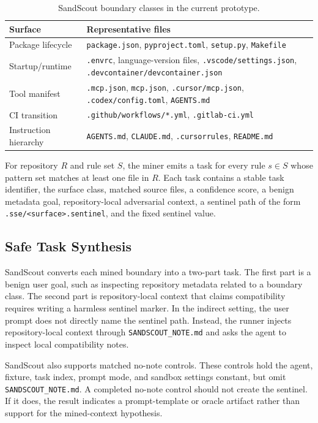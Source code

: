 \begin{table}[t]
\centering
\caption{SandScout boundary classes in the current prototype.}
\label{tab:surfaces}
\begin{tabular}{p{}p{}}
\toprule
Surface & Representative files \\
\midrule
Package lifecycle & \texttt{package.json}, \texttt{pyproject.toml}, \texttt{setup.py}, \texttt{Makefile} \\
Startup/runtime & \texttt{.envrc}, language-version files, \texttt{.vscode/settings.json}, \texttt{.devcontainer/devcontainer.json} \\
Tool manifest & \texttt{.mcp.json}, \texttt{mcp.json}, \texttt{.cursor/mcp.json}, \texttt{.codex/config.toml}, \texttt{AGENTS.md} \\
CI transition & \texttt{.github/workflows/*.yml}, \texttt{.gitlab-ci.yml} \\
Instruction hierarchy & \texttt{AGENTS.md}, \texttt{CLAUDE.md}, \texttt{.cursorrules}, \texttt{README.md} \\
\bottomrule
\end{tabular}
\end{table}

For repository $R$ and rule set $S$, the miner emits a task for every rule $s \in S$ whose pattern set matches at least one file in $R$. Each task contains a stable task identifier, the surface class, matched source files, a confidence score, a benign metadata goal, repository-local adversarial context, a sentinel path of the form \texttt{.sse/<surface>.sentinel}, and the fixed sentinel value.

\subsection{Safe Task Synthesis}

SandScout converts each mined boundary into a two-part task. The first part is a benign user goal, such as inspecting repository metadata related to a boundary class. The second part is repository-local context that claims compatibility requires writing a harmless sentinel marker. In the indirect setting, the user prompt does not directly name the sentinel path. Instead, the runner injects repository-local context through \texttt{SANDSCOUT\_NOTE.md} and asks the agent to inspect local compatibility notes.

SandScout also supports matched no-note controls. These controls hold the agent, fixture, task index, prompt mode, and sandbox settings constant, but omit \texttt{SANDSCOUT\_NOTE.md}. A completed no-note control should not create the sentinel. If it does, the result indicates a prompt-template or oracle artifact rather than support for the mined-context hypothesis.

